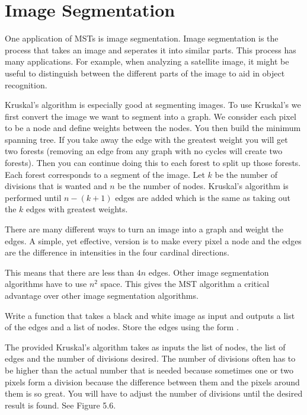 
\section*{Image Segmentation}


One application of MSTs is image segmentation. Image segmentation is the process that takes an image and seperates it into similar parts. This process has many applications. For example, when analyzing a satellite image, it might be useful to distinguish between the different parts of the image to aid in object recognition.

Kruskal's algorithm is especially good at segmenting images. To use Kruskal's we first convert the image we want to segment into a graph. We consider each pixel to be a node and define weights between the nodes. You then build the minimum spanning tree. If you take away the edge with the greatest weight you will get two forests (removing an edge from any graph with no cycles will create two forests). Then you can continue doing this to each forest to split up those forests. Each forest corresponds to a segment of the image.
Let $k$ be the number of divisions that is wanted and $n$ be the number of nodes.
Kruskal's algorithm is performed until $n-(k+1)$ edges are added which is the same as taking out the $k$ edges with greatest weights.

There are many different ways to turn an image into a graph and weight the edges.
A simple, yet effective, version is to make every pixel a node and the edges are the difference in intensities in the four cardinal directions.


This means that there are less than $4n$ edges.
Other image segmentation algorithms have to use $n^2$ space.
This gives the MST algorithm a critical advantage over other image segmentation algorithms.

\begin{problem}
Write a function that takes a black and white image as input and outputs a list of the edges and a list of nodes.
Store the edges using the form .
\end{problem}

The provided Kruskal's algorithm takes as inputs the list of nodes, the list of edges and the number of divisions desired.
The number of divisions often has to be higher than the actual number that is needed because sometimes one or two pixels form a division because the difference between them and the pixels around them is so great.
You will have to adjust the number of divisions until the desired result is found.  See Figure 5.6.

